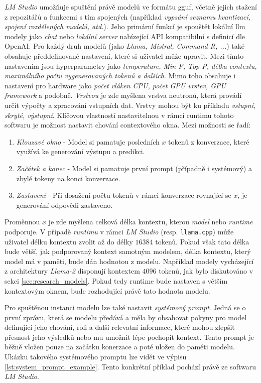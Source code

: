 \documentclass[czech, ma, kiv, he, iso690numb, pdf, viewonly]{fasthesis}
\begin{document}
            \textit{LM Studio} umožňuje spuštění právě modelů ve formátu \acrshort{gguf}, včetně jejich stažení z repozitářů a funkcemi s tím spojených (například \textit{vypsání seznamu kvantizací, spojení rozdělených modelů, atd.}). Jeho primární funkcí je spouštět lokální \Gls{llm} modely jako \textit{chat} nebo \textit{lokální server} nabízející API kompatibilní s definicí dle OpenAI. Pro každý druh modelů (jako \textit{Llama, Mistral, Command R, ...}) také obsahuje předdefinované nastavení, které si uživatel může upravit. Mezi tímto nastavením jsou hyperparametry jako \textit{\gls{temperature}, Min P, Top P, délka \gls{context}u, maximálního počtu vygenerovaných \gls{token}ů a dalších}. Mimo toho obsahuje i nastavení pro hardware jako \textit{počet vláken CPU, počet GPU vrstev, GPU framework} a podobně. \textit{Vrstvou} je zde myšlena vrstva neutronů, která provádí určit výpočty a zpracování vstupních dat. Vrstvy mohou být ku příkladu \textit{vstupní, skryté, výstupní}. Klíčovou vlastností nastavitelnou v rámci runtimu tohoto softwaru je možnost nastavit chování \gls{context}ového okna. Mezi možnosti se řadí: 
            \begin{enumerate}
                \item \textit{Klouzavé okno} - Model si pamatuje posledních \(x\) tokenů z konverzace, které využívá ke generování výstupu a predikci.
                \item \textit{Začátek a konec} - Model si pamatuje první prompt (případně i systémový) a zbylé tokeny na konci konverzace.
                \item \textit{Zastavení} - Při dosažení počtu tokenů v rámci konverzace rovnající se \(x\), je generování odpovědi zastaveno.
            \end{enumerate}
            Proměnnou \(x\) je zde myšlena celková délka kontextu, kterou \textit{model} nebo \textit{runtime} podporuje. V případě \textit{runtimu} v rámci \textit{LM Studio} (resp. \verb|llama.cpp|) může uživatel délku kontextu zvolit až do délky \(16 384\) \gls{token}ů. Pokud však tato délka bude větší, jak podporovaný kontext samotným modelem, délka kontextu, který model má v paměti, bude dán hodnotou z modelu. Například modely vycházející z architektury \textit{Llama-2} disponují kontextem \(4096\) \gls{token}ů, jak bylo diskutováno v sekci \ref{sec:research_models}. Pokud tedy runtime bude nastaven s větším kontextovým oknem, bude rozhodující právě tato hodnota modelu.
            
            Pro spuštěnou instanci modelu lze také nastavit \textit{systémový prompt}. Jedná se o první zprávu, která se modelu předává a měla by obsahovat pokyny pro model definující jeho chování, roli a další relevatní informace, které mohou zlepšit přesnost jeho výsledků nebo mu umožnit lépe pochopit kontext. Tento prompt je běžně vložen pouze na začátku konerzace a poté uložen do paměti modelu. Ukázku takového systémového promptu lze vidět ve výpisu \ref{lst:system_prompt_example}. Tento konkrétní příklad pochází právě ze softwaru \textit{LM Studio}.
\end{document}
